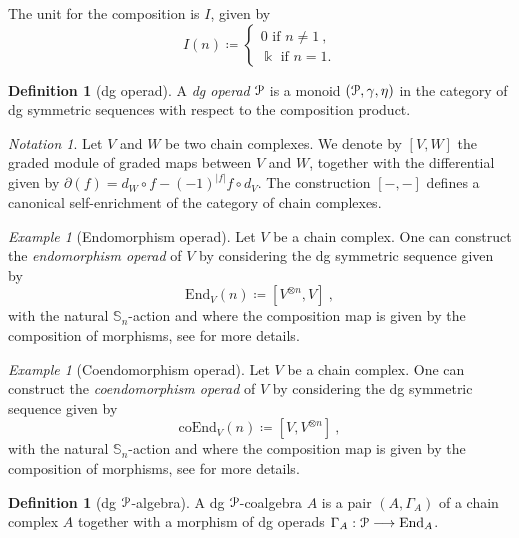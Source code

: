 \documentclass{proc-l}
\renewcommand{\mathcal}{\EuScript}
\newcommand{\oneop}{\mathcal{P}}
\theoremstyle{plain}
\theoremstyle{definition}
\newtheorem{definition}[{theorem}]{Definition}
\theoremstyle{remark}
\newtheorem{notation}[{theorem}]{Notation}
\newtheorem{example}[{theorem}]{Example}
\newcommand{\kk}{\Bbbk}
\begin{document}
The unit for the composition is $ I$, given by
$$
I (n) \coloneqq
\begin{cases}
0 \text{ if }n \neq 1~,
\\
\kk \text{ if }n = 1.
\end{cases}
$$

\begin{definition}[{dg operad}]%
\label{Definition:2.1}
A \textit{dg operad} $\oneop$ is a monoid $(\oneop,\gamma,\eta)$ in the category of dg symmetric sequences with respect to the composition product.
\end{definition}

\begin{notation}%
\label{Notation:2.2}Let $V$ and $W$ be two chain complexes. We denote by $[V,W]$ the graded module of graded maps between $V$ and $W$, together with the differential given by $\partial(f)= d_W \circ f -(-1)^{|f|}f \circ d_V$. The construction $[-,-]$ defines a canonical self-enrichment of the category of  chain complexes.
\end{notation}

\begin{example}[{Endomorphism operad}]%
\label{Example:2.3}
Let $V$ be a chain complex. One can construct the \textit{endomorphism operad} of $V$ by considering the dg symmetric sequence given by
\[
\mathrm{End}_V(n) \coloneqq [V^{\otimes n}, V]~,
\]
with the natural $\mathbb{S}_n$-action and where the composition map is given by the composition of morphisms, see \cite[Chapter 5]{LodayVallette} for more details.
\end{example}

\begin{example}[{Coendomorphism operad}]%
\label{Example:2.4}
Let $V$ be a chain complex. One can construct the \textit{coendomorphism operad} of $V$ by considering the dg symmetric sequence given by
\[
\mathrm{coEnd}_V(n) \coloneqq [V, V^{\otimes n}]~,
\]
with the natural $\mathbb{S}_n$-action and where the composition map is given by the composition of morphisms, see \cite[Chapter 5]{LodayVallette} for more details.
\end{example}

\begin{definition}[{dg $\oneop$-algebra}]%
\label{Definition:2.5}
A dg $\oneop$-coalgebra $A$ is a pair $(A,\Gamma_A)$ of a chain complex $A$ together with a morphism of dg operads $\Gamma_A: \oneop \longrightarrow \mathrm{End}_A$.
\end{definition}
\end{document}
